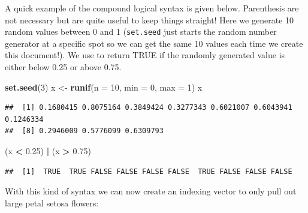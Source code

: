 \documentclass[
]{book}
\newenvironment{Shaded}{\begin{snugshade}}{\end{snugshade}}
\newcommand{\DataTypeTok}[1]{\textcolor[rgb]{0.13,0.29,0.53}{#1}}
\newcommand{\DecValTok}[1]{\textcolor[rgb]{0.00,0.00,0.81}{#1}}
\newcommand{\FloatTok}[1]{\textcolor[rgb]{0.00,0.00,0.81}{#1}}
\newcommand{\KeywordTok}[1]{\textcolor[rgb]{0.13,0.29,0.53}{\textbf{#1}}}
\newcommand{\NormalTok}[1]{#1}
\newcommand{\OperatorTok}[1]{\textcolor[rgb]{0.81,0.36,0.00}{\textbf{#1}}}
\newcommand{\StringTok}[1]{\textcolor[rgb]{0.31,0.60,0.02}{#1}}
\theoremstyle{definition}
\theoremstyle{definition}
\theoremstyle{definition}
\theoremstyle{remark}
\begin{document}
A quick example of the compound logical syntax is given below. Parenthesis are not necessary but are quite useful to keep things straight! Here we generate 10 random values between 0 and 1 (\texttt{set.seed} just starts the random number generator at a specific spot so we can get the same 10 values each time we create this document!). We use \texttt{\textbar{}} to return TRUE if the randomly generated value is either below 0.25 or above 0.75.

\begin{Shaded}
\begin{Highlighting}[]
\KeywordTok{set.seed}\NormalTok{(}\DecValTok{3}\NormalTok{)}
\NormalTok{x <-}\StringTok{ }\KeywordTok{runif}\NormalTok{(}\DataTypeTok{n =} \DecValTok{10}\NormalTok{, }\DataTypeTok{min =} \DecValTok{0}\NormalTok{, }\DataTypeTok{max =} \DecValTok{1}\NormalTok{)}
\NormalTok{x}
\end{Highlighting}
\end{Shaded}

\begin{verbatim}
##  [1] 0.1680415 0.8075164 0.3849424 0.3277343 0.6021007 0.6043941 0.1246334
##  [8] 0.2946009 0.5776099 0.6309793
\end{verbatim}

\begin{Shaded}
\begin{Highlighting}[]
\NormalTok{(x }\OperatorTok{<}\StringTok{ }\FloatTok{0.25}\NormalTok{) }\OperatorTok{|}\StringTok{ }\NormalTok{(x }\OperatorTok{>}\StringTok{ }\FloatTok{0.75}\NormalTok{)}
\end{Highlighting}
\end{Shaded}

\begin{verbatim}
##  [1]  TRUE  TRUE FALSE FALSE FALSE FALSE  TRUE FALSE FALSE FALSE
\end{verbatim}

With this kind of syntax we can now create an indexing vector to only pull out large petal setosa flowers:

\begin{Shaded}
\end{Shaded}
\end{document}
